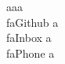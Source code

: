 \documentclass[]{resume}
\newcommand{\seticon}[1]{\textcolor{myblue}{\csname #1\endcsname}}
\begin{document}
aaa\\
\seticon{faGithub} a\\
\seticon{faInbox} a\\
\seticon{faPhone} a\\




% 
% 

% 


% 
% 
% 

% 
% 

\end{document}
